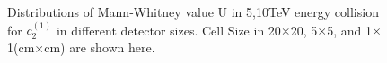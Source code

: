 \documentclass[final,1p,11pt]{elsarticle}
\begin{document}
\begin{figure}
\begin{center}
{   }

\end{center}
\caption{Distributions of Mann-Whitney value U in 5,10TeV energy collision for $c_2^{(1)}$ in different detector sizes. Cell Size in 20$\times$20, 5$\times$5, and 1$\times$1(cm$\times$cm) are shown here.}
\label{fig:cluster_tau21_tau32}
\end{figure}
\end{document}
